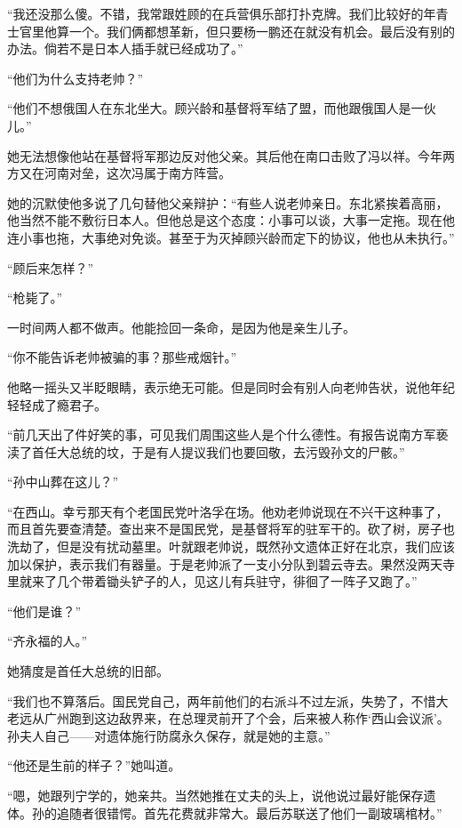 \par “我还没那么傻。不错，我常跟姓顾的在兵营俱乐部打扑克牌。我们比较好的年青士官里他算一个。我们俩都想革新，但只要杨一鹏还在就没有机会。最后没有别的办法。倘若不是日本人插手就已经成功了。”
\par “他们为什么支持老帅？”
\par “他们不想俄国人在东北坐大。顾兴龄和基督将军结了盟，而他跟俄国人是一伙儿。”
\par 她无法想像他站在基督将军那边反对他父亲。其后他在南口击败了冯以祥。今年两方又在河南对垒，这次冯属于南方阵营。
\par 她的沉默使他多说了几句替他父亲辩护：“有些人说老帅亲日。东北紧挨着高丽，他当然不能不敷衍日本人。但他总是这个态度：小事可以谈，大事一定拖。现在他连小事也拖，大事绝对免谈。甚至于为灭掉顾兴龄而定下的协议，他也从未执行。”
\par “顾后来怎样？”
\par “枪毙了。”
\par 一时间两人都不做声。他能捡回一条命，是因为他是亲生儿子。
\par “你不能告诉老帅被骗的事？那些戒烟针。”
\par 他略一摇头又半眨眼睛，表示绝无可能。但是同时会有别人向老帅告状，说他年纪轻轻成了瘾君子。
\par “前几天出了件好笑的事，可见我们周围这些人是个什么德性。有报告说南方军亵渎了首任大总统的坟，于是有人提议我们也要回敬，去污毁孙文的尸骸。”
\par “孙中山葬在这儿？”
\par “在西山。幸亏那天有个老国民党叶洛孚在场。他劝老帅说现在不兴干这种事了，而且首先要查清楚。查出来不是国民党，是基督将军的驻军干的。砍了树，房子也洗劫了，但是没有扰动墓里。叶就跟老帅说，既然孙文遗体正好在北京，我们应该加以保护，表示我们有器量。于是老帅派了一支小分队到碧云寺去。果然没两天寺里就来了几个带着锄头铲子的人，见这儿有兵驻守，徘徊了一阵子又跑了。”
\par “他们是谁？”
\par “齐永福的人。”
\par 她猜度是首任大总统的旧部。
\par “我们也不算落后。国民党自己，两年前他们的右派斗不过左派，失势了，不惜大老远从广州跑到这边敌界来，在总理灵前开了个会，后来被人称作‘西山会议派’。孙夫人自己——对遗体施行防腐永久保存，就是她的主意。”
\par “他还是生前的样子？”她叫道。
\par “嗯，她跟列宁学的，她亲共。当然她推在丈夫的头上，说他说过最好能保存遗体。孙的追随者很错愕。首先花费就非常大。最后苏联送了他们一副玻璃棺材。”
